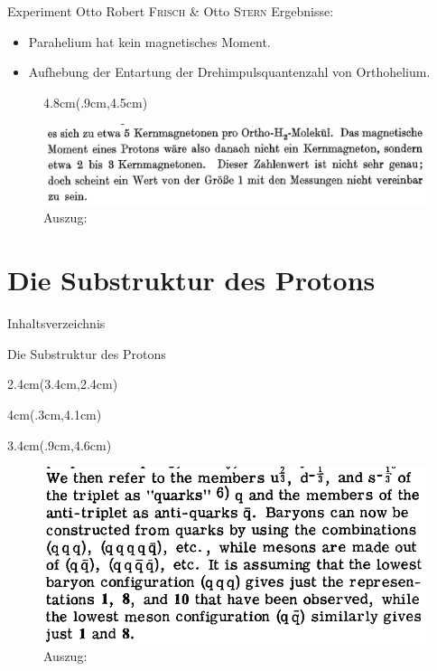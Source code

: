 \documentclass[t,9pt]{beamer}
\newcommand{\highlight}[3]{ \begin{textblock*}{#1}(#2,#3) \begin{tcolorbox} [enhanced,opacityfill=.1,colback=blue] \end{tcolorbox} \end{textblock*} } %
\begin{document}
        \begin{frame}{Experiment Otto Robert \textsc{Frisch} \& Otto \textsc{Stern}}
                Ergebnisse:
                \begin{itemize}
                        \item Parahelium hat kein magnetisches Moment.
                        \item Aufhebung der Entartung der Drehimpulsquantenzahl von Orthohelium.
                \end{itemize}
                \begin{figure}
                        \highlight{4.8cm}{.9cm}{4.5cm}
                        \includegraphics[width=.9\textwidth]{prosi_mag_moment_proton_nicht_1.png}
                        \caption{Auszug:\cite{FrischStern1933}}
                \end{figure}
        \end{frame}

        \section{Die Substruktur des Protons}

        \begin{frame}{Inhaltsverzeichnis}
                \tableofcontents[currentsection]
        \end{frame}

        \begin{frame}{Die Substruktur des Protons}
                \highlight{2.4cm}{3.4cm}{2.4cm}
                \highlight{4cm}{.3cm}{4.1cm}
                \highlight{3.4cm}{.9cm}{4.6cm}
                \begin{figure}
                        \includegraphics[width=\textwidth]{prosi_gell_mann_quarks.png}
                        \caption{Auszug:\cite{Gellmann1964}}
                \end{figure}
        \end{frame}
\end{document}
